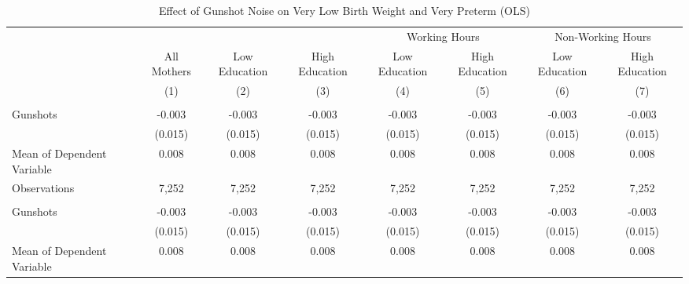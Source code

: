 \begin{table}[H]
\centering
\caption{\label{main_table}Effect of Gunshot Noise on Very Low Birth Weight and Very Preterm (OLS)}
\centering
\begin{threeparttable}
\fontsize{10}{12}\selectfont
\begin{tabular}[t]{lccccccc}
\toprule
\multicolumn{4}{c}{ } & \multicolumn{2}{c}{Working Hours} & \multicolumn{2}{c}{Non-Working Hours} \\
\cmidrule(l{3pt}r{3pt}){5-6} \cmidrule(l{3pt}r{3pt}){7-8}
\multicolumn{1}{c}{ } & \multicolumn{1}{c}{All Mothers} & \multicolumn{1}{c}{Low Education} & \multicolumn{1}{c}{High Education} & \multicolumn{1}{c}{Low Education} & \multicolumn{1}{c}{High Education} & \multicolumn{1}{c}{Low Education} & \multicolumn{1}{c}{High Education} \\
\cmidrule(l{3pt}r{3pt}){2-2} \cmidrule(l{3pt}r{3pt}){3-3} \cmidrule(l{3pt}r{3pt}){4-4} \cmidrule(l{3pt}r{3pt}){5-5} \cmidrule(l{3pt}r{3pt}){6-6} \cmidrule(l{3pt}r{3pt}){7-7} \cmidrule(l{3pt}r{3pt}){8-8}
  & (1) & (2) & (3) & (4) & (5) & (6) & (7)\\
\midrule
\addlinespace[0.3em]
\multicolumn{8}{l}{\textit{Panel A: Very Low Birth Weight}}\\
\hline
\hspace{1em}Gunshots & -0.003 & -0.003 & -0.003 & -0.003 & -0.003 & -0.003 & \vphantom{1} -0.003\\
\hspace{1em} & (0.015) & (0.015) & (0.015) & (0.015) & (0.015) & (0.015) & \vphantom{1} (0.015)\\
\hspace{1em}Mean of Dependent Variable & 0.008 & 0.008 & 0.008 & 0.008 & 0.008 & 0.008 & \vphantom{1} 0.008\\
\hspace{1em}Observations & 7,252 & 7,252 & 7,252 & 7,252 & 7,252 & 7,252 & \vphantom{1} 7,252\\
\addlinespace[0.5cm]
\multicolumn{8}{l}{\textit{Panel B: Very Preterm}}\\
\hline
\hspace{1em}Gunshots & -0.003 & -0.003 & -0.003 & -0.003 & -0.003 & -0.003 & -0.003\\
\hspace{1em} & (0.015) & (0.015) & (0.015) & (0.015) & (0.015) & (0.015) & (0.015)\\
\hspace{1em}Mean of Dependent Variable & 0.008 & 0.008 & 0.008 & 0.008 & 0.008 & 0.008 & 0.008\\

\end{tabular}
\end{threeparttable}
\end{table}
